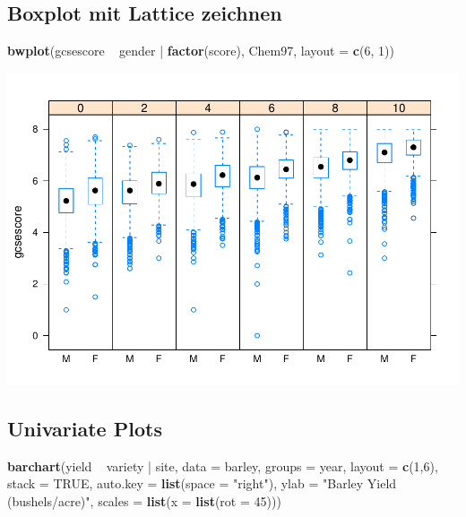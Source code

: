 \documentclass[]{article}
\newenvironment{Shaded}{\begin{snugshade}}{\end{snugshade}}
\newcommand{\KeywordTok}[1]{\textcolor[rgb]{0.13,0.29,0.53}{\textbf{{#1}}}}
\newcommand{\DataTypeTok}[1]{\textcolor[rgb]{0.13,0.29,0.53}{{#1}}}
\newcommand{\DecValTok}[1]{\textcolor[rgb]{0.00,0.00,0.81}{{#1}}}
\newcommand{\StringTok}[1]{\textcolor[rgb]{0.31,0.60,0.02}{{#1}}}
\newcommand{\OtherTok}[1]{\textcolor[rgb]{0.56,0.35,0.01}{{#1}}}
\newcommand{\NormalTok}[1]{{#1}}
\begin{document}
\subsection{Boxplot mit Lattice
zeichnen}\label{boxplot-mit-lattice-zeichnen-1}

\begin{Shaded}
\begin{Highlighting}[]
\KeywordTok{bwplot}\NormalTok{(gcsescore ~}\StringTok{ }\NormalTok{gender |}\StringTok{ }\KeywordTok{factor}\NormalTok{(score), Chem97,}
 \DataTypeTok{layout =} \KeywordTok{c}\NormalTok{(}\DecValTok{6}\NormalTok{, }\DecValTok{1}\NormalTok{))}
\end{Highlighting}
\end{Shaded}

\includegraphics{Intro_Datenanalyse1_files/figure-latex/unnamed-chunk-175-1.pdf}

\subsection{Univariate Plots}\label{univariate-plots}

\begin{Shaded}
\begin{Highlighting}[]
\KeywordTok{barchart}\NormalTok{(yield ~}\StringTok{ }\NormalTok{variety |}\StringTok{ }\NormalTok{site, }\DataTypeTok{data =} \NormalTok{barley,}
         \DataTypeTok{groups =} \NormalTok{year, }\DataTypeTok{layout =} \KeywordTok{c}\NormalTok{(}\DecValTok{1}\NormalTok{,}\DecValTok{6}\NormalTok{), }\DataTypeTok{stack =} \OtherTok{TRUE}\NormalTok{,}
         \DataTypeTok{auto.key =} \KeywordTok{list}\NormalTok{(}\DataTypeTok{space =} \StringTok{"right"}\NormalTok{),}
         \DataTypeTok{ylab =} \StringTok{"Barley Yield (bushels/acre)"}\NormalTok{,}
         \DataTypeTok{scales =} \KeywordTok{list}\NormalTok{(}\DataTypeTok{x =} \KeywordTok{list}\NormalTok{(}\DataTypeTok{rot =} \DecValTok{45}\NormalTok{)))}
\end{Highlighting}
\end{Shaded}
\end{document}
